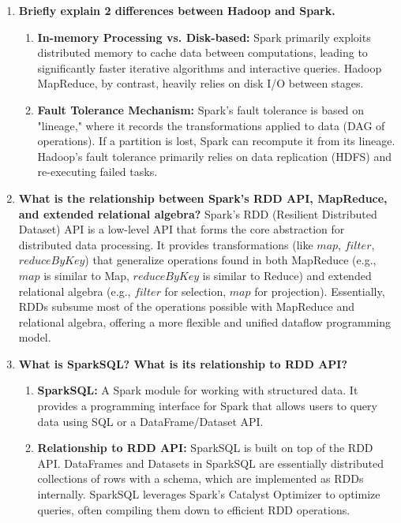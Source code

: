 \documentclass{article}
\begin{document}
\begin{enumerate}
    \item \textbf{Briefly explain 2 differences between Hadoop and Spark.}
    \begin{enumerate}[label=\alph*)]
        \item \textbf{In-memory Processing vs. Disk-based:} Spark primarily exploits distributed memory to cache data between computations, leading to significantly faster iterative algorithms and interactive queries. Hadoop MapReduce, by contrast, heavily relies on disk I/O between stages.
        \item \textbf{Fault Tolerance Mechanism:} Spark's fault tolerance is based on "lineage," where it records the transformations applied to data (DAG of operations). If a partition is lost, Spark can recompute it from its lineage. Hadoop's fault tolerance primarily relies on data replication (HDFS) and re-executing failed tasks.
    \end{enumerate}

    \item \textbf{What is the relationship between Spark's RDD API, MapReduce, and extended relational algebra?}
    Spark's RDD (Resilient Distributed Dataset) API is a low-level API that forms the core abstraction for distributed data processing. It provides transformations (like $map$, $filter$, $reduceByKey$) that generalize operations found in both MapReduce (e.g., $map$ is similar to Map, $reduceByKey$ is similar to Reduce) and extended relational algebra (e.g., $filter$ for selection, $map$ for projection). Essentially, RDDs subsume most of the operations possible with MapReduce and relational algebra, offering a more flexible and unified dataflow programming model.

    \item \textbf{What is SparkSQL? What is its relationship to RDD API?}
    \begin{enumerate}[label=\alph*)]
        \item \textbf{SparkSQL:} A Spark module for working with structured data. It provides a programming interface for Spark that allows users to query data using SQL or a DataFrame/Dataset API.
        \item \textbf{Relationship to RDD API:} SparkSQL is built on top of the RDD API. DataFrames and Datasets in SparkSQL are essentially distributed collections of rows with a schema, which are implemented as RDDs internally. SparkSQL leverages Spark's Catalyst Optimizer to optimize queries, often compiling them down to efficient RDD operations.
    \end{enumerate}


\end{enumerate}
\end{document}
